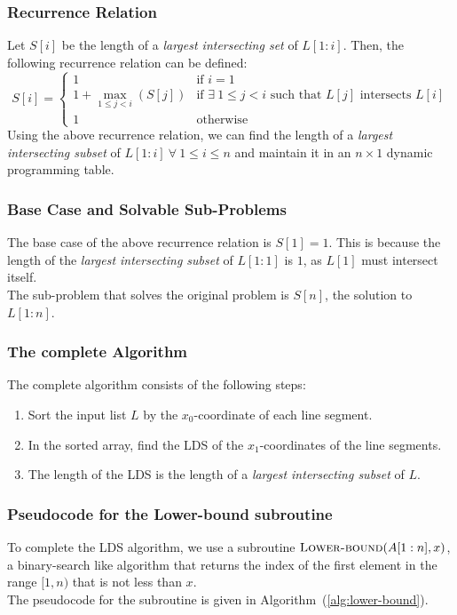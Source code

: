 \documentclass[12pt]{report}
\begin{document}
    \subsubsection*{Recurrence Relation}
    Let $S[i]$ be the length of a \textit{largest intersecting set} of $L[1:i]$.
    Then, the following recurrence relation can be defined:
    \begin{equation}
        S[i] = \begin{cases}
            1 & \text{if } i = 1 \\
            1 + \max_{1 \le j < i} (S[j]) & \text{if } \exists \ 1 \le j < i \text{ such that } L[j] \text{ intersects } L[i] \\
            1 & \text{otherwise}
        \end{cases}
    \end{equation}
    Using the above recurrence relation, we can find the length of a \textit{largest intersecting subset} of $L[1:i] \ \forall \ 1 \le i \le n$
    and maintain it in an $n \times 1$ dynamic programming table.

    \subsubsection*{Base Case and Solvable Sub-Problems}
    The base case of the above recurrence relation is $S[1] = 1$.
    This is because the length of the \textit{largest intersecting subset} of $L[1:1]$ is $1$, as $L[1]$ must intersect itself.
    \vspace*{10pt} \\
    The sub-problem that solves the original problem is $S[n]$, the solution to $L[1:n]$.

    \subsubsection*{The complete Algorithm}
    The complete algorithm consists of the following steps:
    \begin{enumerate}
        \item Sort the input list $L$ by the $x_{0}$-coordinate of each line segment.
        \item In the sorted array, find the LDS of the $x_{1}$-coordinates of the line segments.
        \item The length of the LDS is the length of a \textit{largest intersecting subset} of $L$.
    \end{enumerate}

    \subsubsection*{Pseudocode for the Lower-bound subroutine}
    To complete the LDS algorithm, we use a subroutine $\Call{Lower-bound}{A[1:n], x}$, a binary-search like algorithm that
    returns the index of the first element in the range $[1, n)$ that is not less than $x$.
    \vspace*{10pt}\\
    The pseudocode for the subroutine is given in Algorithm~(\ref{alg:lower-bound}).
\end{document}
